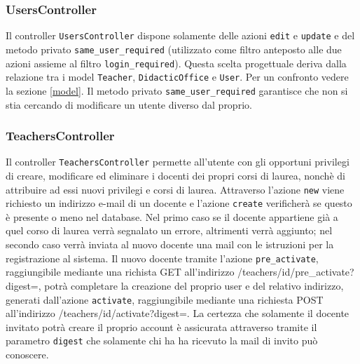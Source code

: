 \documentclass[11pt,a4paper]{article}
\begin{document}
\subsubsection{UsersController}
Il controller \verb|UsersController| dispone solamente delle azioni \verb|edit| e \verb|update| e del metodo privato \verb|same_user_required| (utilizzato come filtro anteposto alle due azioni assieme al filtro \verb|login_required|). Questa scelta progettuale deriva dalla relazione tra i model \verb|Teacher|, \verb|DidacticOffice| e \verb|User|. Per un confronto vedere la sezione \ref{model}.
Il metodo privato \verb|same_user_required| garantisce che non si stia cercando di modificare un utente diverso dal proprio.
\subsubsection{TeachersController}
Il controller \verb|TeachersController| permette all'utente con gli opportuni privilegi di creare, modificare ed eliminare i docenti dei propri corsi di laurea, nonchè di attribuire ad essi nuovi privilegi e corsi di laurea. Attraverso l'azione \verb|new| viene richiesto un indirizzo e-mail di un docente e l'azione \verb|create| verificherà se questo è presente o meno nel database. Nel primo caso se il docente appartiene già a quel corso di laurea verrà segnalato un errore, altrimenti verrà aggiunto; nel secondo caso verrà inviata al nuovo docente una mail con le istruzioni per la registrazione al sistema. Il nuovo docente tramite l'azione \verb|pre_activate|, raggiungibile mediante una richista GET all'indirizzo /teachers/id/pre\_activate?digest=, potrà completare la creazione del proprio user e del relativo indirizzo, generati dall'azione \verb|activate|, raggiungibile mediante una richiesta POST all'indirizzo /teachers/id/activate?digest=. La certezza che solamente il docente invitato potrà creare il proprio account è assicurata attraverso tramite il parametro \verb|digest| che solamente chi ha ha ricevuto la mail di invito può conoscere.
\end{document}
